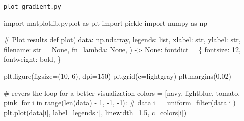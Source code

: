 \documentclass[
  letterpaper,
]{krantz}
\makeatletter
\newenvironment{Shaded}{\begin{snugshade}}{\end{snugshade}}
\newcommand{\BuiltInTok}[1]{\textcolor[rgb]{0.00,0.23,0.31}{#1}}
\newcommand{\CommentTok}[1]{\textcolor[rgb]{0.37,0.37,0.37}{#1}}
\newcommand{\ControlFlowTok}[1]{\textcolor[rgb]{0.00,0.23,0.31}{#1}}
\newcommand{\DecValTok}[1]{\textcolor[rgb]{0.68,0.00,0.00}{#1}}
\newcommand{\FloatTok}[1]{\textcolor[rgb]{0.68,0.00,0.00}{#1}}
\newcommand{\ImportTok}[1]{\textcolor[rgb]{0.00,0.46,0.62}{#1}}
\newcommand{\KeywordTok}[1]{\textcolor[rgb]{0.00,0.23,0.31}{#1}}
\newcommand{\NormalTok}[1]{\textcolor[rgb]{0.00,0.23,0.31}{#1}}
\newcommand{\OperatorTok}[1]{\textcolor[rgb]{0.37,0.37,0.37}{#1}}
\newcommand{\StringTok}[1]{\textcolor[rgb]{0.13,0.47,0.30}{#1}}
\newcommand{\VariableTok}[1]{\textcolor[rgb]{0.07,0.07,0.07}{#1}}
\newenvironment{kframe}{%
\medskip{}
\setlength{\fboxsep}{.8em}
 \def\at@end@of@kframe{}%
 \ifinner\ifhmode%
  \def\at@end@of@kframe{\end{minipage}}%
  \begin{minipage}{\columnwidth}%
 \fi\fi%
 \def\FrameCommand##1{\hskip\@totalleftmargin \hskip-\fboxsep
 \colorbox{shadecolor}{##1}\hskip-\fboxsep
     \hskip-\linewidth \hskip-\@totalleftmargin \hskip\columnwidth}%
 \MakeFramed {\advance\hsize-\width
   \@totalleftmargin\z@ \linewidth\hsize
   \@setminipage}}%
 {\par\unskip\endMakeFramed%
 \at@end@of@kframe}
\renewenvironment{Shaded}{\begin{kframe}}{\end{kframe}}
\theoremstyle{plain}
\theoremstyle{definition}
\theoremstyle{definition}
\theoremstyle{remark}
\makeatother
\begin{document}
\begin{codelisting}

\caption{\texttt{plot\_gradient.py}}

\begin{Shaded}
\begin{Highlighting}[]

\ImportTok{import}\NormalTok{ matplotlib.pyplot }\ImportTok{as}\NormalTok{ plt}
\ImportTok{import}\NormalTok{ pickle}
\ImportTok{import}\NormalTok{ numpy }\ImportTok{as}\NormalTok{ np}


\CommentTok{\# Plot results}
\KeywordTok{def}\NormalTok{ plot(}
\NormalTok{        data: np.ndarray,}
\NormalTok{        legends: }\BuiltInTok{list}\NormalTok{,}
\NormalTok{        xlabel: }\BuiltInTok{str}\NormalTok{,}
\NormalTok{        ylabel: }\BuiltInTok{str}\NormalTok{,}
\NormalTok{        filename: }\BuiltInTok{str} \OperatorTok{=} \VariableTok{None}\NormalTok{,}
\NormalTok{        fn}\OperatorTok{=}\KeywordTok{lambda}\NormalTok{: }\VariableTok{None}\NormalTok{, ) }\OperatorTok{{-}\textgreater{}} \VariableTok{None}\NormalTok{:}
\NormalTok{    fontdict }\OperatorTok{=}\NormalTok{ \{}
            \StringTok{\textquotesingle{}fontsize\textquotesingle{}}\NormalTok{: }\DecValTok{12}\NormalTok{,}
            \StringTok{\textquotesingle{}fontweight\textquotesingle{}}\NormalTok{: }\StringTok{\textquotesingle{}bold\textquotesingle{}}\NormalTok{,}
\NormalTok{            \}}
    
\NormalTok{    plt.figure(figsize}\OperatorTok{=}\NormalTok{(}\DecValTok{10}\NormalTok{, }\DecValTok{6}\NormalTok{), dpi}\OperatorTok{=}\DecValTok{150}\NormalTok{)}
\NormalTok{    plt.grid(c}\OperatorTok{=}\StringTok{\textquotesingle{}lightgray\textquotesingle{}}\NormalTok{)}
\NormalTok{    plt.margins(}\FloatTok{0.02}\NormalTok{)}
    
    \CommentTok{\# revers the loop for a better visualization}
\NormalTok{    colors }\OperatorTok{=}\NormalTok{ [}\StringTok{\textquotesingle{}navy\textquotesingle{}}\NormalTok{, }\StringTok{\textquotesingle{}lightblue\textquotesingle{}}\NormalTok{, }\StringTok{\textquotesingle{}tomato\textquotesingle{}}\NormalTok{, }\StringTok{\textquotesingle{}pink\textquotesingle{}}\NormalTok{]}
    \ControlFlowTok{for}\NormalTok{ i }\KeywordTok{in} \BuiltInTok{range}\NormalTok{(}\BuiltInTok{len}\NormalTok{(data) }\OperatorTok{{-}} \DecValTok{1}\NormalTok{, }\OperatorTok{{-}}\DecValTok{1}\NormalTok{, }\OperatorTok{{-}}\DecValTok{1}\NormalTok{):}
        \CommentTok{\# data[i] = uniform\_filter(data[i])}
\NormalTok{        plt.plot(data[i], label}\OperatorTok{=}\NormalTok{legends[i], linewidth}\OperatorTok{=}\FloatTok{1.5}\NormalTok{, c}\OperatorTok{=}\NormalTok{colors[i])}
    

\end{Highlighting}
\end{Shaded}
\end{codelisting}
\end{document}
